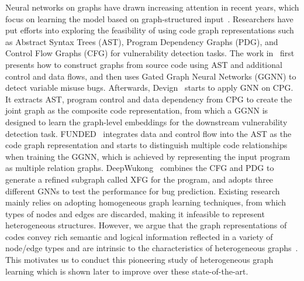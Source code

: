 Neural networks on graphs have drawn increasing attention in recent years, 
which focus on learning the model based on graph-structured input~\cite{li2015gated,kipf2016semi,zhang2021gps}. 
Researchers have put efforts into exploring the feasibility of using code graph representations such as 
Abstract Syntax Trees (AST), Program Dependency Graphs (PDG), and Control Flow Graphs (CFG) for vulnerability detection tasks. 
The work in~\cite{allamanis2018learning} first presents how to construct graphs from source code using AST and additional control and data flows, 
and then uses Gated Graph Neural Networks (GGNN) to detect variable misuse bugs. 
Afterwards, Devign~\cite{devign} starts to apply GNN on CPG. It extracts AST, 
program control and data dependency from CPG to create the joint graph as the composite code representation, 
from which a GGNN is designed to learn the graph-level embeddings for the downstream vulnerability detection task. 
%
FUNDED~\cite{funded} integrates data and control flow into the AST 
as the code graph representation and starts to distinguish multiple code relationships when training the GGNN, 
which is achieved by representing the input program as multiple relation graphs. 
%
DeepWukong~\cite{deepwukong} combines the CFG and PDG to generate a refined subgraph called XFG for the program, 
and adopts three different GNNs to test the performance for bug prediction. 
Existing research mainly relies on adopting homogeneous graph learning techniques, 
from which types of nodes and edges are discarded, making it infeasible to represent heterogeneous structures. 
However, we argue that the graph representations of codes convey rich semantic and logical information reflected 
in a variety of node/edge types and are intrinsic to the characteristics of heterogeneous graphs~\cite{wang2022survey}. 
This motivates us to conduct this pioneering study of heterogeneous graph learning which is shown later to improve over these state-of-the-art.